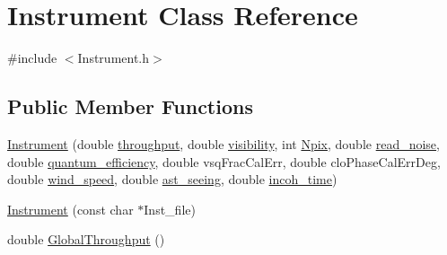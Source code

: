 \hypertarget{classInstrument}{
\section{Instrument Class Reference}
\label{classInstrument}
}


{\ttfamily \#include $<$Instrument.h$>$}

\subsection*{Public Member Functions}
\begin{DoxyCompactItemize}
\item 
\hyperlink{classInstrument_af68972d40961b639787c594e3d62857e}{Instrument} (double \hyperlink{classInstrument_a24c5a78025ce2474443eb34b8828df08}{throughput}, double \hyperlink{classInstrument_a8a79a07bd650ab75118beff9f46886a6}{visibility}, int \hyperlink{classInstrument_a349e2122c222f16ed712b5fb8660adb4}{Npix}, double \hyperlink{classInstrument_accb5f463e89c0c73d4c0e5b6b80397af}{read\_\-noise}, double \hyperlink{classInstrument_af352575aa1a6bb255db663a53fbb2b8b}{quantum\_\-efficiency}, double vsqFracCalErr, double cloPhaseCalErrDeg, double \hyperlink{classInstrument_a7e18ced4e4e556e5203c046c2ebb3c63}{wind\_\-speed}, double \hyperlink{classInstrument_a508dcac890549428696372a66ed5d3bc}{ast\_\-seeing}, double \hyperlink{classInstrument_ab431265cc3192bfcc9ceeafd1d30605b}{incoh\_\-time})
\item 
\hyperlink{classInstrument_a1842ca96cd3d19a634121fd5cafc6ff4}{Instrument} (const char $\ast$Inst\_\-file)
\item 
double \hyperlink{classInstrument_aa43fea34962ffe530cc5cfb0dbaa67c2}{GlobalThroughput} ()
\end{DoxyCompactItemize}

